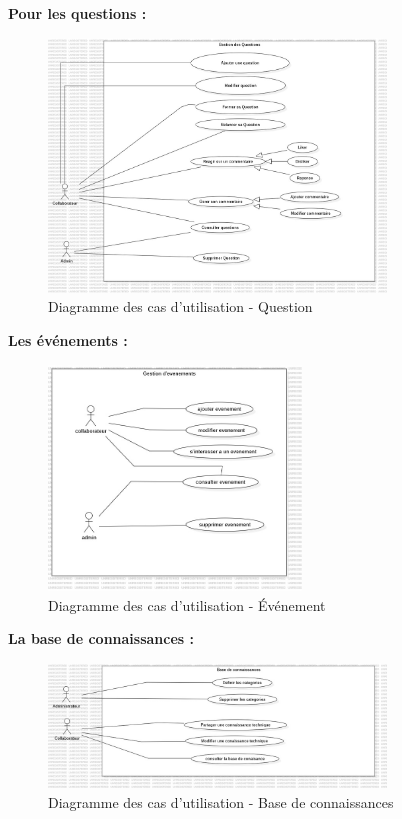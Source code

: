 \documentclass{article}
\begin{document}
                \textbf{Pour les questions :}
                \begin{figure}[h!]
                    \centering
                    \includegraphics[width=0.8\textwidth]{assets/diagrammes/jpg/Model1!useCaseQuestion_0.jpg}
                    \caption{Diagramme des cas d'utilisation - Question}
                \end{figure}
                
                \FloatBarrier
                
                \textbf{Les événements :}
                \begin{figure}[h!]
                    \centering
                    \includegraphics[width=0.6\textwidth]{assets/diagrammes/jpg/Model2!UseCaseEvent_1.jpg}
                    \caption{Diagramme des cas d'utilisation - Événement}
                \end{figure}
                
                \FloatBarrier
                \newpage
                \textbf{La base de connaissances :}
                \begin{figure}[h!]
                    \centering
                    \includegraphics[width=0.8\textwidth]{assets/diagrammes/jpg/Model3!UseCaseDoc_2.jpg}
                    \caption{Diagramme des cas d'utilisation - Base de connaissances}
                \end{figure}
                
\end{document}
